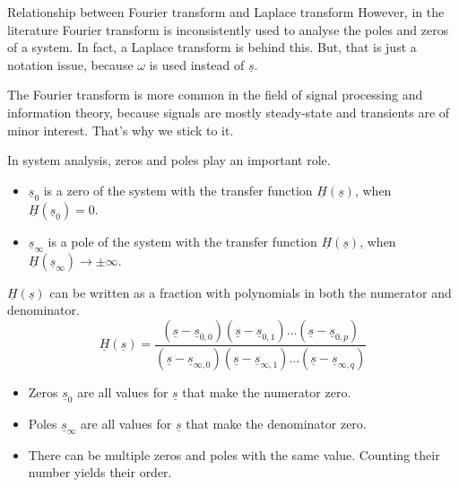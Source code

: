 \begin{refsection}
\begin{excursus}{Relationship between Fourier transform and Laplace transform}
	However, in the literature Fourier transform is inconsistently used to analyse the poles and zeros of a system. In fact, a Laplace transform is behind this. But, that is just a notation issue, because $\omega$ is used instead of $\underline{s}$.
	
	The Fourier transform is more common in the field of signal processing and information theory, because signals are mostly steady-state and transients are of minor interest. That's why we stick to it.
\end{excursus}

In system analysis, zeros and poles play an important role.
\begin{itemize}
	\item $\underline{s}_0$ is a zero of the system with the transfer function $\underline{H}(\underline{s})$, when $\underline{H}(\underline{s}_0) = 0$. 
	\item $\underline{s}_\infty$ is a pole of the system with the transfer function $\underline{H}(\underline{s})$, when $\underline{H}(\underline{s}_\infty) \rightarrow \pm \infty$. 
\end{itemize}

$\underline{H}(\underline{s})$ can be written as a fraction with polynomials in both the numerator and denominator.
\begin{equation}
	\underline{H}(\underline{s}) = \frac{(\underline{s} - \underline{s}_{0,0}) (\underline{s} - \underline{s}_{0,1}) \ldots  (\underline{s} - \underline{s}_{0,p})}{(\underline{s} - \underline{s}_{\infty,0}) (\underline{s} - \underline{s}_{\infty,1}) \ldots (\underline{s} - \underline{s}_{\infty,q})}
\end{equation}
\begin{itemize}
	\item Zeros $\underline{s}_0$ are all values for $\underline{s}$ that make the numerator zero.
	\item Poles $\underline{s}_\infty$ are all values for $\underline{s}$ that make the denominator zero.
	\item There can be multiple zeros and poles with the same value. Counting their number yields their order.
\end{itemize}


\end{refsection}
